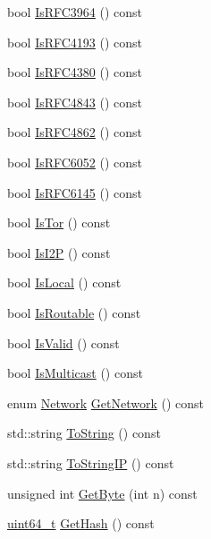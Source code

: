 \begin{DoxyCompactItemize}
\item 
bool \hyperlink{class_c_net_addr_a312065a9243977a602412665d6148f26}{Is\+R\+F\+C3964} () const 
\item 
bool \hyperlink{class_c_net_addr_ac47bf0c27f8026497b1933393a6570ba}{Is\+R\+F\+C4193} () const 
\item 
bool \hyperlink{class_c_net_addr_afc6e370bb97c97f83260bba898ec4731}{Is\+R\+F\+C4380} () const 
\item 
bool \hyperlink{class_c_net_addr_ad69e51fffff5ee9fcabedda51f10a3ce}{Is\+R\+F\+C4843} () const 
\item 
bool \hyperlink{class_c_net_addr_a5cba67eb628ea99ea68addfe14913fa3}{Is\+R\+F\+C4862} () const 
\item 
bool \hyperlink{class_c_net_addr_a8057dbecf9f5b4d33a643990b6eec873}{Is\+R\+F\+C6052} () const 
\item 
bool \hyperlink{class_c_net_addr_ab5d91a88d77777004c8ebd658c8caf54}{Is\+R\+F\+C6145} () const 
\item 
bool \hyperlink{class_c_net_addr_a3fba9e0b18f531c0ed15794a30e8165d}{Is\+Tor} () const 
\item 
bool \hyperlink{class_c_net_addr_a4502c75bf0bf1b5d07738587627288b4}{Is\+I2\+P} () const 
\item 
bool \hyperlink{class_c_net_addr_a6cfa18f323424408cf7ace36c9a7c2e2}{Is\+Local} () const 
\item 
bool \hyperlink{class_c_net_addr_a35131b2792434d1c9a860c583b610ab6}{Is\+Routable} () const 
\item 
bool \hyperlink{class_c_net_addr_a52a1b506f07e5450057e12a8b5a7fbcd}{Is\+Valid} () const 
\item 
bool \hyperlink{class_c_net_addr_ab6593d2d75ca7cc6f00c2831cc0a8b73}{Is\+Multicast} () const 
\item 
enum \hyperlink{netbase_8h_acc9a38c714afe79b5035cb36f560dac3}{Network} \hyperlink{class_c_net_addr_a34a4760424f5c51998fc3baf82ccb5c8}{Get\+Network} () const 
\item 
std\+::string \hyperlink{class_c_net_addr_aae906cecdba331389f249a64693895b6}{To\+String} () const 
\item 
std\+::string \hyperlink{class_c_net_addr_a7ec845c27b63853fb0db08a4d154266f}{To\+String\+I\+P} () const 
\item 
unsigned int \hyperlink{class_c_net_addr_a0793d30a6baae6e3d4e06084ec33eddd}{Get\+Byte} (int n) const 
\item 
\hyperlink{stdint_8h_aaa5d1cd013383c889537491c3cfd9aad}{uint64\+\_\+t} \hyperlink{class_c_net_addr_a4c94fea8695ef97adf5b2a18e1074308}{Get\+Hash} () const 

\end{DoxyCompactItemize}
